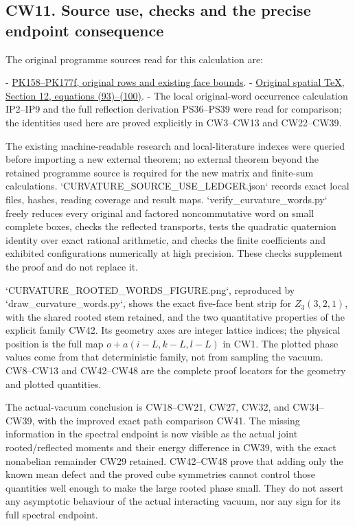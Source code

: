 \documentclass[11pt]{article}
\begin{document}
\subsection*{CW11. Source use, checks and the precise endpoint consequence}

The original programme sources read for this calculation are:

- \href{https://github.com/KokunoYumeto/yang-mills-interacting-workbench/blob/485b61423c1f4e1805deb453c1b6b342b27842b6/yang-mills/continuations/20260930-s6-ns-moment-map-bridge/PERIOD_COUPLING_AND_PHYSICAL_KERNELS.md#L3500}{PK158–PK177f, original rows and existing face bounds}.
- \href{https://github.com/KokunoYumeto/yang-mills-interacting-workbench/blob/485b61423c1f4e1805deb453c1b6b342b27842b6/yang-mills/continuations/20260930-s6-ns-moment-map-bridge/sources/spatial/spatial_continuum.tex#L1752}{Original spatial TeX, Section 12, equations (93)–(100)}.
- The local original-word occurrence calculation IP2–IP9 and
  the full reflection derivation PS36–PS39 were read for comparison;
  the identities used here are proved explicitly in CW3–CW13
  and CW22–CW39.

The existing machine-readable research and local-literature indexes
were queried before importing a new external theorem; no external
theorem beyond the retained programme source is required for the
new matrix and finite-sum calculations. `CURVATURE\_SOURCE\_USE\_LEDGER.json`
records exact local files, hashes, reading coverage and result maps.
`verify\_curvature\_words.py` freely reduces every original and
factored noncommutative word on small complete boxes, checks the
reflected transports, tests the quadratic quaternion identity over
exact rational arithmetic, and checks the finite coefficients and
exhibited configurations numerically at high precision. These
checks supplement the proof and do not replace it.

`CURVATURE\_ROOTED\_WORDS\_FIGURE.png`, reproduced by
`draw\_curvature\_words.py`, shows the exact five-face bent strip
for \(Z_3(3,2,1)\), with the shared rooted stem retained, and
the two quantitative properties of the explicit family CW42.
Its geometry axes are integer lattice indices; the physical
position is the full map \(o+a(i-L,k-L,l-L)\) in CW1.
The plotted phase values come from that deterministic family,
not from sampling the vacuum. CW8–CW13 and CW42–CW48 are the
complete proof locators for the geometry and plotted quantities.

The actual-vacuum conclusion is CW18–CW21, CW27, CW32, and
CW34–CW39, with the improved exact path comparison CW41.
The missing information in the spectral endpoint is now visible
as the actual joint rooted/reflected moments and their energy
difference in CW39, with the exact nonabelian remainder CW29
retained. CW42–CW48 prove that adding only the known mean defect
and the proved cube symmetries cannot control those quantities
well enough to make the large rooted phase small. They do not
assert any asymptotic behaviour of the actual interacting vacuum,
nor any sign for its full spectral endpoint.
\end{document}
